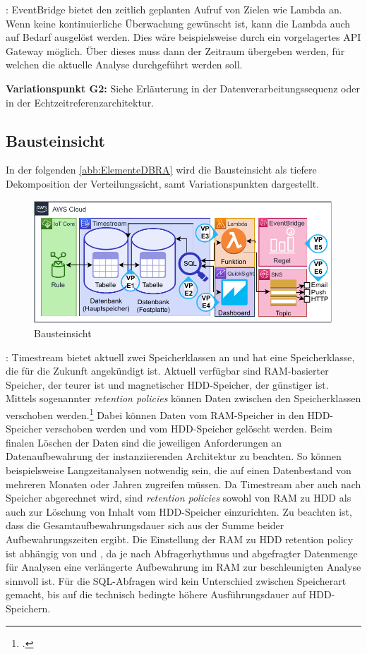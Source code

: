 : EventBridge bietet den zeitlich geplanten Aufruf von Zielen wie Lambda an. Wenn keine kontinuierliche Überwachung gewünscht ist, kann die Lambda auch auf Bedarf ausgelöst werden. Dies wäre beispielsweise durch ein vorgelagertes API Gateway möglich. Über dieses muss dann der Zeitraum übergeben werden, für welchen die aktuelle Analyse durchgeführt werden soll.

\textbf{Variationspunkt G2:} Siehe Erläuterung in der Datenverarbeitungssequenz oder in  der Echtzeitreferenzarchitektur.


\subsection{Bausteinsicht}
In der folgenden \autoref{abb:ElementeDBRA} wird die Bausteinsicht als tiefere Dekomposition der Verteilungssicht, samt Variationspunkten dargestellt.
\begin{figure}[H]
\centering
\includegraphics[width=\textwidth]{graphics/DB-RA-Elements.pdf}
\caption{Bausteinsicht}
\label{abb:ElementeDBRA}
\end{figure}

: Timestream bietet aktuell zwei Speicherklassen an und hat eine Speicherklasse, die für die Zukunft angekündigt ist. Aktuell verfügbar sind \ac{RAM}-basierter Speicher, der teurer ist und magnetischer \ac{HDD}-Speicher, der günstiger ist. Mittels sogenannter \textit{retention policies} können Daten zwischen den Speicherklassen verschoben werden.\footcite[Vgl. auch im Folgenden][]{AmazonWebServicesInc..o.J.bp} Dabei können Daten vom \ac{RAM}-Speicher in den \ac{HDD}-Speicher verschoben werden und vom \ac{HDD}-Speicher gelöscht werden. Beim finalen Löschen der Daten sind die jeweiligen Anforderungen an Datenaufbewahrung der instanziierenden Architektur zu beachten. So können beispielsweise Langzeitanalysen notwendig sein, die auf einen Datenbestand von mehreren Monaten oder Jahren zugreifen müssen. Da Timestream aber auch nach Speicher abgerechnet wird, sind \textit{retention policies} sowohl von \ac{RAM} zu \ac{HDD} als auch zur Löschung von Inhalt vom \ac{HDD}-Speicher einzurichten. Zu beachten ist, dass die Gesamtaufbewahrungsdauer sich aus der Summe beider Aufbewahrungszeiten ergibt. Die Einstellung der \ac{RAM} zu \ac{HDD} retention policy ist abhängig von  und , da je nach Abfragerhythmus und abgefragter Datenmenge für Analysen eine verlängerte Aufbewahrung im \ac{RAM} zur beschleunigten Analyse sinnvoll ist. Für die \ac{SQL}-Abfragen wird kein Unterschied zwischen Speicherart gemacht, bis auf die technisch bedingte höhere Ausführungsdauer auf \ac{HDD}-Speichern.


